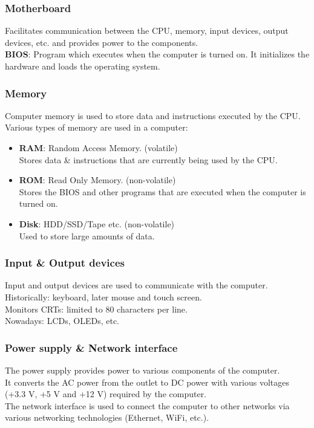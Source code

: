 \documentclass{beamer}
\begin{document}
\begin{frame}
  \frametitle{Motherboard}
  Facilitates communication between the CPU, memory, input devices, output devices, etc. and provides power to the components. \\
  \vspace{5mm}
  \textbf{BIOS}: Program which executes when the computer is turned on. It initializes the hardware and loads the operating system.\\
\end{frame}
\begin{frame}
  \frametitle{Memory}
  Computer memory is used to store data and instructions executed by the CPU.\\
  \vspace{5mm}
  Various types of memory are used in a computer: 
  \begin{itemize}
    \item \textbf{RAM}: Random Access Memory. (volatile)\\Stores data \& instructions that are currently being used by the CPU.
    \item \textbf{ROM}: Read Only Memory. (non-volatile)\\Stores the BIOS and other programs that are executed when the computer is turned on.
    \item \textbf{Disk}: HDD/SSD/Tape etc. (non-volatile)\\Used to store large amounts of data. 
  \end{itemize}
\end{frame}
\begin{frame}
  \frametitle{Input \& Output devices}
  Input and output devices are used to communicate with the computer.\\
  \vspace{5mm}
  Historically: keyboard, later mouse and touch screen. \\
  \vspace{5mm}
  Monitors CRTs: limited to 80 characters per line.\\
  \vspace{5mm}
  Nowadays: LCDs, OLEDs, etc.\\
\end{frame}
\begin{frame}
  \frametitle{Power supply \& Network interface}
  The power supply provides power to various components of the computer.\\
  \vspace{5mm}
  It converts the AC power from the outlet to DC power with various voltages (+3.3 V, +5 V and +12 V) required by the computer.\\
  \vspace{5mm}
  The network interface is used to connect the computer to other networks via various networking technologies (Ethernet, WiFi, etc.).\\
\end{frame}
\end{document}
